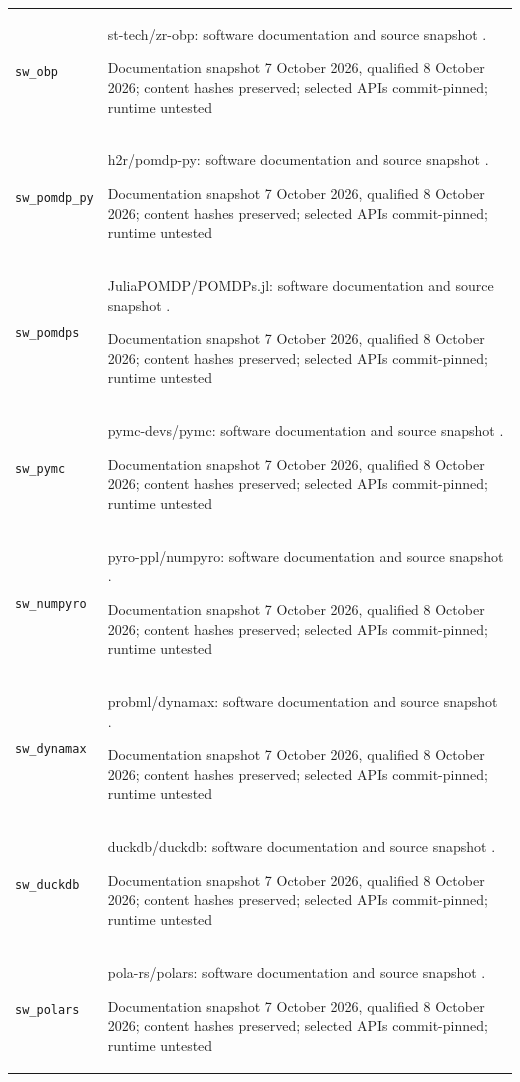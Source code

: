 \begin{longtable}{P{32mm}P{112mm}}
{\scriptsize\texttt{sw\_obp}} & st-tech/zr-obp: software documentation and source snapshot \citep{sw_obp}.\par Documentation snapshot 7 October 2026, qualified 8 October 2026; content hashes preserved; selected APIs commit-pinned; runtime untested\\
{\scriptsize\texttt{sw\_pomdp\_py}} & h2r/pomdp-py: software documentation and source snapshot \citep{sw_pomdp_py}.\par Documentation snapshot 7 October 2026, qualified 8 October 2026; content hashes preserved; selected APIs commit-pinned; runtime untested\\
{\scriptsize\texttt{sw\_pomdps}} & JuliaPOMDP/POMDPs.jl: software documentation and source snapshot \citep{sw_pomdps}.\par Documentation snapshot 7 October 2026, qualified 8 October 2026; content hashes preserved; selected APIs commit-pinned; runtime untested\\
{\scriptsize\texttt{sw\_pymc}} & pymc-devs/pymc: software documentation and source snapshot \citep{sw_pymc}.\par Documentation snapshot 7 October 2026, qualified 8 October 2026; content hashes preserved; selected APIs commit-pinned; runtime untested\\
{\scriptsize\texttt{sw\_numpyro}} & pyro-ppl/numpyro: software documentation and source snapshot \citep{sw_numpyro}.\par Documentation snapshot 7 October 2026, qualified 8 October 2026; content hashes preserved; selected APIs commit-pinned; runtime untested\\
{\scriptsize\texttt{sw\_dynamax}} & probml/dynamax: software documentation and source snapshot \citep{sw_dynamax}.\par Documentation snapshot 7 October 2026, qualified 8 October 2026; content hashes preserved; selected APIs commit-pinned; runtime untested\\
{\scriptsize\texttt{sw\_duckdb}} & duckdb/duckdb: software documentation and source snapshot \citep{sw_duckdb}.\par Documentation snapshot 7 October 2026, qualified 8 October 2026; content hashes preserved; selected APIs commit-pinned; runtime untested\\
{\scriptsize\texttt{sw\_polars}} & pola-rs/polars: software documentation and source snapshot \citep{sw_polars}.\par Documentation snapshot 7 October 2026, qualified 8 October 2026; content hashes preserved; selected APIs commit-pinned; runtime untested\\

\end{longtable}
